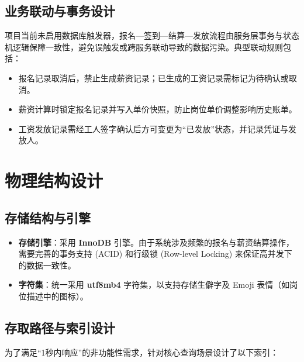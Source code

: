\documentclass[UTF8,a4paper,12pt]{article}
\begin{document}
\subsection{业务联动与事务设计}
项目当前未启用数据库触发器，报名—签到—结算—发放流程由服务层事务与状态机逻辑保障一致性，避免误触发或跨服务联动导致的数据污染。典型联动规则包括：

\begin{itemize}
    \item 报名记录取消后，禁止生成薪资记录；已生成的工资记录需标记为待确认或取消。
    \item 薪资计算时锁定报名记录并写入单价快照，防止岗位单价调整影响历史账单。
    \item 工资发放记录需经工人签字确认后方可变更为“已发放”状态，并记录凭证与发放人。
\end{itemize}

\section{物理结构设计}

\subsection{存储结构与引擎}
\begin{itemize}
    \item \textbf{存储引擎}：采用 \textbf{InnoDB} 引擎。由于系统涉及频繁的报名与薪资结算操作，需要完善的事务支持 (ACID) 和行级锁 (Row-level Locking) 来保证高并发下的数据一致性。
    \item \textbf{字符集}：统一采用 \textbf{utf8mb4} 字符集，以支持存储生僻字及 Emoji 表情（如岗位描述中的图标）。
\end{itemize}

\subsection{存取路径与索引设计}
为了满足“1秒内响应”的非功能性需求，针对核心查询场景设计了以下索引：
\end{document}

